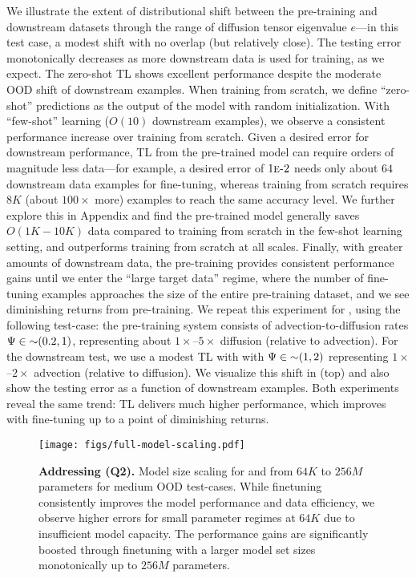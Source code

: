 We illustrate the extent of distributional shift between the pre-training and downstream datasets through the range of diffusion tensor eigenvalue $e$---in this test case, a modest shift with no overlap (but relatively close).
%
The testing error monotonically decreases as
more downstream data is used for training, as we expect. 
The zero-shot TL shows excellent performance despite the moderate OOD shift of downstream examples. 
When training from scratch, we define ``zero-shot'' predictions as the output of the model with random initialization. 
With ``few-shot'' learning ($O(10)$ downstream examples), we observe a consistent performance increase over training from scratch. 
Given a desired error for downstream performance, TL from the pre-trained model can require orders of magnitude less data---for example, a desired error of $1\text{\sc{e}-}{2}$ needs only about $64$ downstream data examples for fine-tuning, whereas training from scratch requires $8K$  (about $100\times$ more) examples to reach the same accuracy level. 
We further explore this in Appendix  and find the pre-trained model generally saves $O(1K-10K)$ data compared to training from scratch in the few-shot learning setting, and outperforms training from scratch at all scales.
Finally, with greater amounts of downstream data, the pre-training provides consistent performance gains until we enter the ``large target data'' regime, where the number of fine-tuning examples approaches the size of the entire pre-training dataset, and we see diminishing returns from pre-training.
%
We repeat this experiment for \sysB{}, using the following test-case: 
the pre-training system \sysBzeropttwoone{} consists of advection-to-diffusion rates $\Psi \in {\small \sim}(0.2, 1)$, representing about $1\times$--$5\times$ diffusion (relative to advection). 
For the downstream test, we use a modest TL with \sysBonetwo{} with $\Psi \in {\small \sim}(1, 2)$ representing $1\times$--$2\times$ advection (relative to diffusion). 
We visualize this shift in  (top) and also show the testing error as a function of downstream examples. 
Both experiments reveal the same trend: TL delivers much higher performance, which improves with fine-tuning up to a point of diminishing returns.


\begin{figure*}
\texttt{[image: figs/full-model-scaling.pdf]}
\caption{\textbf{Addressing (Q2).} Model size scaling for \sysA{} and \sysB{} from $64K$ to $256M$ parameters for medium OOD test-cases. While finetuning consistently improves the model performance and data efficiency, we observe higher errors for small parameter regimes at $64K$ due to insufficient model capacity. The performance gains are significantly boosted through finetuning with a larger model set sizes monotonically up to $256M$ parameters.}
\label{fig:Q2}
\end{figure*}

